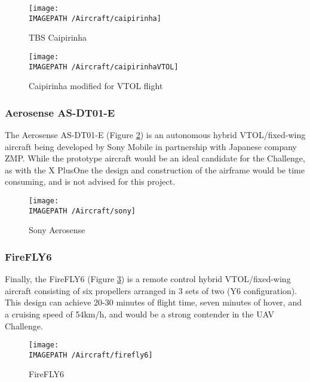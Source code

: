 \begin{figure}[!ht]
	\centering
	\begin{minipage}{.5\textwidth}
		\centering
		\texttt{[image: \\IMAGEPATH /Aircraft/caipirinha]}
		\caption{TBS Caipirinha}
		\label{fig:caipirinha}
	\end{minipage}%
	\begin{minipage}{.5\textwidth}
		\centering
		\texttt{[image: \\IMAGEPATH /Aircraft/caipirinhaVTOL]}
		\caption{Caipirinha modified for VTOL flight}
		\label{fig:caipirinhaVTOL}
	\end{minipage}
\end{figure}

\subsubsection*{Aerosense AS-DT01-E}
The Aerosense AS-DT01-E\cite{ref:sony} (Figure \ref{fig:sony}) is an autonomous hybrid VTOL/fixed-wing aircraft being developed by Sony Mobile in partnership with Japanese company ZMP. While the prototype aircraft would be an ideal candidate for the Challenge, as with the X PlusOne the design and construction of the airframe would be time consuming, and is not advised for this project.

\begin{figure}[!ht]
	\centering
	\texttt{[image: \\IMAGEPATH /Aircraft/sony]}
	\caption{Sony Aerosense}
	\label{fig:sony}
\end{figure}

\subsubsection*{FireFLY6}
Finally, the FireFLY6\cite{ref:firefly6} (Figure \ref{fig:firefly6}) is a remote control hybrid VTOL/fixed-wing aircraft consisting of six propellers arranged in 3 sets of two (Y6 configuration). This design can achieve 20-30 minutes of flight time, seven minutes of hover, and a cruising speed of 54km/h, and would be a strong contender in the UAV Challenge.

\begin{figure}[!h]
	\centering
	\texttt{[image: \\IMAGEPATH /Aircraft/firefly6]}
	\caption{FireFLY6}
	\label{fig:firefly6}
\end{figure}